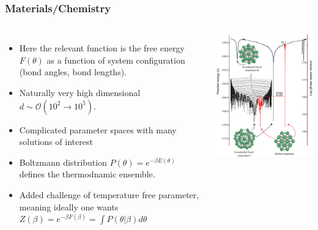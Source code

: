\documentclass[aspectratio=169]{beamer}
\begin{document}
\begin{frame}
    \frametitle{Materials/Chemistry}
    \begin{columns}
        \begin{itemize}
            \item Here the relevant function is the free energy $F(\theta)$ as a function of system configuration (bond angles, bond lengths).
            \item Naturally very high dimensional $d\sim\mathcal{O}(10^2\to10^5)$.
            \item Complicated parameter spaces with many solutions of interest
            \item Boltzmann distribution $P(\theta) = e^{-\beta E(\theta)}$ defines the thermodnamic ensemble.
            \item Added challenge of temperature free parameter, meaning ideally one wants $Z(\beta) = e^{-\beta F(\beta)} = \int P(\theta|\beta) d\theta$
        \end{itemize}
        
        \includegraphics[width=\textwidth]{figures/materials}
        
    \end{columns}
\end{frame}
\end{document}
